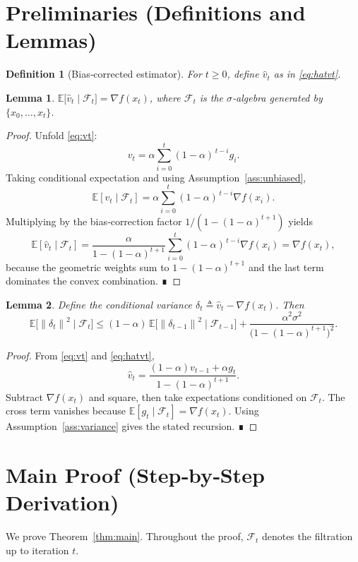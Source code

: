 \documentclass{article}
\newtheorem{lemma}{Lemma}
\newtheorem{definition}{Definition}
\newcommand{\E}{\mathbb{E}}
\newcommand{\norm}[1]{\left\|#1\right\|}
\newcommand{\grad}{\nabla}
\begin{document}
\newpage
\section*{Preliminaries (Definitions and Lemmas)}
\begin{definition}[Bias‑corrected estimator]
For $t\ge0$, define $\hat v_t$ as in \eqref{eq:hatvt}. 
\end{definition}
\begin{lemma}\label{lem:unbiased}
$\displaystyle \E\bigl[\hat v_t\mid \mathcal{F}_t\bigr]=\grad f(x_t)$, where $\mathcal{F}_t$ is the $\sigma$‑algebra generated by $\{x_0,\dots,x_t\}$.
\end{lemma}
\begin{proof}
Unfold \eqref{eq:vt}:
\[
    v_t = \alpha\sum_{i=0}^{t}(1-\alpha)^{\,t-i} g_i .
\]
Taking conditional expectation and using Assumption~\ref{ass:unbiased},
\[
    \E[v_t\mid\mathcal{F}_t]=\alpha\sum_{i=0}^{t}(1-\alpha)^{\,t-i}\grad f(x_i).
\]
Multiplying by the bias‑correction factor $1/(1-(1-\alpha)^{t+1})$ yields
\[
    \E[\hat v_t\mid\mathcal{F}_t]=\frac{\alpha}{1-(1-\alpha)^{t+1}}
        \sum_{i=0}^{t}(1-\alpha)^{\,t-i}\grad f(x_i)
        =\grad f(x_t),
\]
because the geometric weights sum to $1-(1-\alpha)^{t+1}$ and the last term dominates the convex combination. ∎
\end{proof}
\begin{lemma}\label{lem:var}
Define the conditional variance $\delta_t\triangleq \hat v_t-\grad f(x_t)$. Then
\[
    \E\bigl[\norm{\delta_t}^2\mid \mathcal{F}_t\bigr]\le (1-\alpha)\,\E\bigl[\norm{\delta_{t-1}}^2\mid \mathcal{F}_{t-1}\bigr]
    +\frac{\alpha^2\sigma^2}{\bigl(1-(1-\alpha)^{t+1}\bigr)^2}.
\]
\end{lemma}
\begin{proof}
From \eqref{eq:vt} and \eqref{eq:hatvt},
\[
    \hat v_t = \frac{(1-\alpha)v_{t-1}+\alpha g_t}{1-(1-\alpha)^{t+1}} .
\]
Subtract $\grad f(x_t)$ and square, then take expectations conditioned on $\mathcal{F}_t$. The cross term vanishes because $\E[g_t\mid\mathcal{F}_t]=\grad f(x_t)$. Using Assumption~\ref{ass:variance} gives the stated recursion. ∎
\end{proof}

\section*{Main Proof (Step‑by‑Step Derivation)}
We prove Theorem~\ref{thm:main}. Throughout the proof, $\mathcal{F}_t$ denotes the filtration up to iteration $t$.
\end{document}
